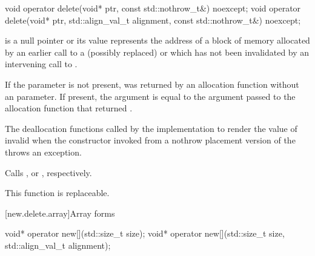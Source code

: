 %
\begin{itemdecl}
void operator delete(void* ptr, const std::nothrow_t&) noexcept;
void operator delete(void* ptr, std::align_val_t alignment, const std::nothrow_t&) noexcept;
\end{itemdecl}

\begin{itemdescr}
\pnum
\expects
{} is a null pointer or
its value represents the address of
a block of memory allocated by
an earlier call to a (possibly replaced)
or
which has not been invalidated by an intervening call to
.

\pnum
If the  parameter is not present,
 was returned by an allocation function
without an  parameter.
If present, the  argument
is equal to the  argument
passed to the allocation function that returned .

\pnum
\effects
The
deallocation functions
called by the implementation
to render the value of  invalid
when the constructor invoked from a nothrow
placement version of the  throws an exception.

\pnum
{}
Calls ,
or ,
respectively.

\pnum
\remarks
This function is replaceable.
\end{itemdescr}

[new.delete.array]{Array forms}

%
\begin{itemdecl}
void* operator new[](std::size_t size);
void* operator new[](std::size_t size, std::align_val_t alignment);
\end{itemdecl}

